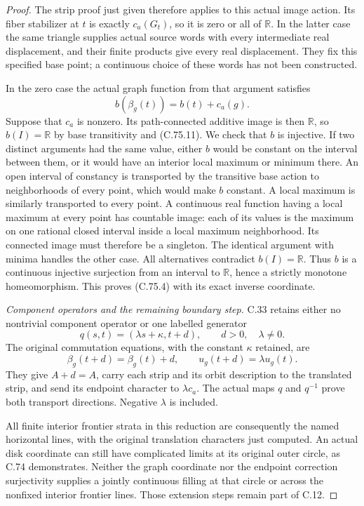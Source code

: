 \begin{proof}
The strip proof just given
therefore applies to this
actual image action. Its
fiber stabilizer at $t$ is
exactly $c_a(G_t)$, so it is
zero or all of $\mathbb R$.
In the latter case the same
triangle supplies actual
source words with every
intermediate real displacement,
and their finite products
give every real displacement.
They fix this specified base
point; a continuous choice
of these words has not been
constructed.

In the zero case the actual
graph function from that
argument satisfies
\[
           b(\beta_g(t))=b(t)+c_a(g).
                                                               \tag{C.75.11}
\]
Suppose that $c_a$ is nonzero.
Its path-connected additive
image is then $\mathbb R$,
so $b(I)=\mathbb R$ by base
transitivity and (C.75.11).
We check that $b$ is injective.
If two distinct arguments
had the same value, either
$b$ would be constant on
the interval between them,
or it would have an interior
local maximum or minimum
there.
An open interval of constancy
is transported by the
transitive base action to
neighborhoods of every point,
which would make $b$ constant.
A local maximum is similarly
transported to every point.
A continuous real function
having a local maximum at
every point has countable
image: each of its values
is the maximum on one
rational closed interval
inside a local maximum
neighborhood. Its connected
image must therefore be
a singleton. The identical
argument with minima handles
the other case.
All alternatives contradict
$b(I)=\mathbb R$.
Thus $b$ is a continuous
injective surjection from
an interval to $\mathbb R$,
hence a strictly monotone
homeomorphism. This proves
(C.75.4) with its exact
inverse coordinate.

\emph{Component operators and the remaining boundary step.}
C.33 retains either no
nontrivial component operator
or one labelled generator
\[
       q(s,t)=(\lambda s+\kappa,t+d),
                    \qquad d>0,\quad\lambda\ne0 .
                                                               \tag{C.75.12}
\]
The original commutation
equations, with the constant
$\kappa$ retained, are
\[
 \beta_g(t+d)=\beta_g(t)+d,\qquad
 u_g(t+d)=\lambda u_g(t).
                                                               \tag{C.75.13}
\]
They give $A+d=A$, carry
each strip and its orbit
description to the translated
strip, and send its endpoint
character to $\lambda c_a$.
The actual maps $q$ and
$q^{-1}$ prove both transport
directions. Negative $\lambda$
is included.

All finite interior frontier
strata in this reduction
are consequently the named
horizontal lines, with the
original translation
characters just computed.
An actual disk coordinate
can still have complicated
limits at its original
outer circle, as C.74
demonstrates. Neither the
graph coordinate nor the
endpoint correction
surjectivity supplies a
jointly continuous filling
at that circle or across
the nonfixed interior
frontier lines. Those
extension steps remain
part of C.12.
\end{proof}
